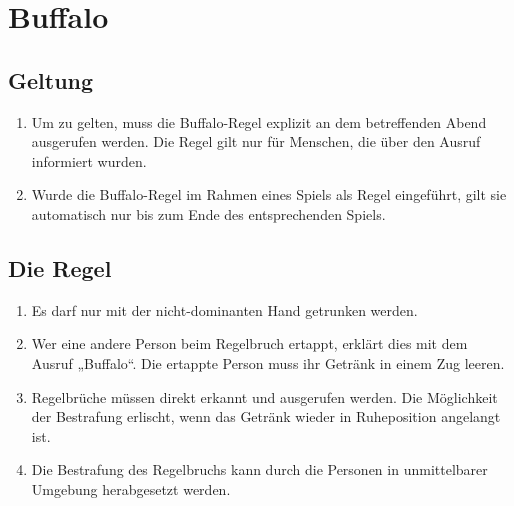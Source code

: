 \chapter{Buffalo}
\section{Geltung}
\begin{enumerate}[label={(\arabic*)}]
    \item
    Um zu gelten, muss die Buffalo-Regel explizit an dem betreffenden Abend ausgerufen werden.
    Die Regel gilt nur für Menschen, die über den Ausruf informiert wurden.

    \item
    Wurde die Buffalo-Regel im Rahmen eines Spiels als Regel eingeführt, gilt sie automatisch nur bis zum Ende des entsprechenden Spiels.
\end{enumerate}

\section{Die Regel}
\begin{enumerate}[label={(\arabic*)}]
    \item
    Es darf nur mit der nicht-dominanten Hand getrunken werden.

    \item
    Wer eine andere Person beim Regelbruch ertappt, erklärt dies mit dem Ausruf „Buffalo“.
    Die ertappte Person muss ihr Getränk in einem Zug leeren.

    \item
    Regelbrüche müssen direkt erkannt und ausgerufen werden.
    Die Möglichkeit der Bestrafung erlischt, wenn das Getränk wieder in Ruheposition angelangt ist.

    \item
    Die Bestrafung des Regelbruchs kann durch die Personen in unmittelbarer Umgebung herabgesetzt werden.
\end{enumerate}
